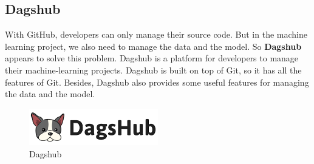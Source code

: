 \subsection{Dagshub}
With GitHub, developers can only manage their source code. But in the machine learning project, we also need to manage the data and the model. So \textbf{Dagshub} appears to solve this problem.
Dagshub is a platform for developers to manage their machine-learning projects. Dagshub is built on top of Git, so it has all the features of Git. Besides, Dagshub also provides some useful features for managing the data and the model.

\begin{figure}[ht]
    \centering
    \includegraphics[width=0.5\textwidth]{../Images/8.Technology_Stack/dagshub_logo.png}
    \caption{Dagshub}
    \label{fig:dagshub}
\end{figure}

